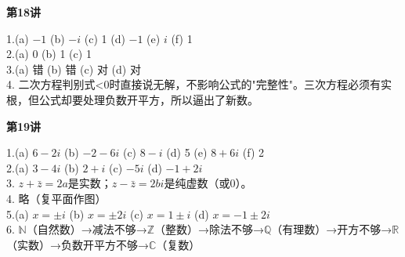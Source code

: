 
\textbf{第18讲}

1.(a) $-1$ \quad (b) $-i$ \quad (c) 1 \quad (d) $-1$ \quad (e) $i$ \quad (f) 1\\
2.(a) 0 \quad (b) 1 \quad (c) 1\\
3.(a) 错 \quad (b) 错 \quad (c) 对 \quad (d) 对\\
4. 二次方程判别式<0时直接说无解，不影响公式的"完整性"。三次方程必须有实根，但公式却要处理负数开平方，所以逼出了新数。

\textbf{第19讲}

1.(a) $6-2i$ \quad (b) $-2-6i$ \quad (c) $8-i$ \quad (d) 5 \quad (e) $8+6i$ \quad (f) 2\\
2.(a) $3-4i$ \quad (b) $2+i$ \quad (c) $-5i$ \quad (d) $-1+2i$\\
3. $z+\bar{z}=2a$是实数；$z-\bar{z}=2bi$是纯虚数（或0）。\\
4. 略（复平面作图）\\
5.(a) $x=\pm i$ \quad (b) $x=\pm 2i$ \quad (c) $x=1\pm i$ \quad (d) $x=-1\pm 2i$\\
6. $\mathbb{N}$（自然数）→减法不够→$\mathbb{Z}$（整数）→除法不够→$\mathbb{Q}$（有理数）→开方不够→$\mathbb{R}$（实数）→负数开平方不够→$\mathbb{C}$（复数）
